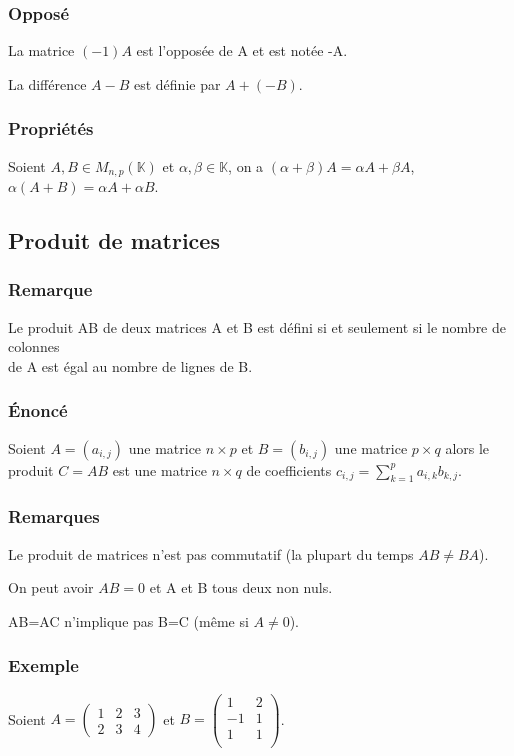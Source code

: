 \documentclass[a4paper,10pt]{book} %
\newcommand{\K}{\mathbb{K}}
\begin{document}
\subsubsection{Opposé}
La matrice $(-1)A$ est l'opposée de A et est notée -A.

La différence $A-B$ est définie par $A+(-B)$.

\subsubsection{Propriétés}
Soient $A,B\in M_{n,p}(\K)$ et $\alpha, \beta \in \K$, on a $(\alpha+\beta)A=\alpha A+\beta A$, $\alpha(A+B)=\alpha A+\alpha B$.

\subsection{Produit de matrices}
\subsubsection{Remarque}
Le produit AB de deux matrices A et B est défini si et seulement si le nombre de colonnes\\
de A est égal au nombre de lignes de B.

\subsubsection{Énoncé}
Soient $A=(a_{i,j})$ une matrice $n\times p$ et $B=(b_{i,j})$ une matrice $p\times q$ alors le produit $C=AB$ est une matrice $n\times q$ de coefficients $c_{i,j}=\sum\limits_{k=1}^{p} a_{i,k}b_{k,j}$.

\subsubsection{Remarques}
Le produit de matrices n'est pas commutatif (la plupart du temps $AB\neq BA$).

On peut avoir $AB=0$ et A et B tous deux non nuls.

AB=AC n'implique pas B=C (même si $A\neq 0$).

\subsubsection{Exemple}
Soient $A=\begin{pmatrix}
1 & 2 & 3\\ 2 & 3 & 4
\end{pmatrix}$ et $B=\begin{pmatrix}
1 & 2 \\
-1 & 1 \\
1 & 1\\
\end{pmatrix}$.\\\\
\end{document}
